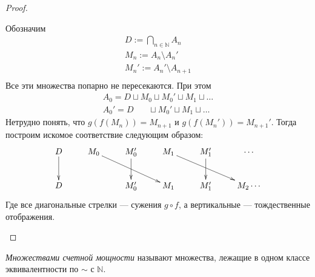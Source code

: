 \begin{proof}
\begin{itemize}
        Обозначим
        \begin{gather*}
            D := \bigcap_{n \in \mathbb{N}}{A_n} \\
            M_n := A_n \setminus A_n' \\
            M_n' := A_n' \setminus A_{n + 1} \\
        \end{gather*}
        Все эти множества попарно не пересекаются. При этом
        \begin{gather*}
            A_0 = D \sqcup M_0 \sqcup M_0' \sqcup M_1 \sqcup \ldots \\
            A_0' = D ~~~~~~~~ \sqcup M_0' \sqcup M_1 \sqcup \ldots
        \end{gather*}
        Нетрудно понять, что $g(f(M_n)) = M_{n+1}$ и $g(f(M_n')) = M_{n+1}'$.
        Тогда построим искомое соответствие следующим образом:
        \begin{displaymath}
            \xymatrix{ D \ar[d] & M_0 \ar[drr] & M_0' \ar[d] & M_1 \ar[drr]
            & M_1' \ar[d] & \cdots \\
                       D & & M_0' & M_1 & M_1' & M_2\cdots }
        \end{displaymath}
        Где все диагональные стрелки --- сужения $g \circ f$, а вертикальные ---
        тождественные отображения.
    \end{itemize}
\end{proof}

\begin{definition}
    \textit{Множествами счетной мощности} называют множества, лежащие в одном
    классе эквивалентности по $\sim$ с $\mathbb{N}$.
\end{definition}

